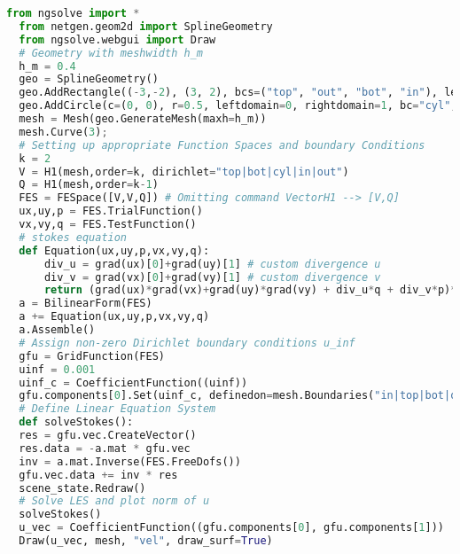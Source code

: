 \begin{appendix}
\begin{lstlisting}[language=Python, title=Basic Stokes PDE's with Python3 and NGSolve, label=basic_stokes]
  from ngsolve import *
  from netgen.geom2d import SplineGeometry
  from ngsolve.webgui import Draw
  # Geometry with meshwidth h_m
  h_m = 0.4
  geo = SplineGeometry()
  geo.AddRectangle((-3,-2), (3, 2), bcs=("top", "out", "bot", "in"), leftdomain=1, rightdomain=0)
  geo.AddCircle(c=(0, 0), r=0.5, leftdomain=0, rightdomain=1, bc="cyl", maxh=h_m) 
  mesh = Mesh(geo.GenerateMesh(maxh=h_m))
  mesh.Curve(3);
  # Setting up appropriate Function Spaces and boundary Conditions
  k = 2
  V = H1(mesh,order=k, dirichlet="top|bot|cyl|in|out")
  Q = H1(mesh,order=k-1)
  FES = FESpace([V,V,Q]) # Omitting command VectorH1 --> [V,Q] 
  ux,uy,p = FES.TrialFunction()
  vx,vy,q = FES.TestFunction()
  # stokes equation
  def Equation(ux,uy,p,vx,vy,q):
      div_u = grad(ux)[0]+grad(uy)[1] # custom divergence u
      div_v = grad(vx)[0]+grad(vy)[1] # custom divergence v
      return (grad(ux)*grad(vx)+grad(uy)*grad(vy) + div_u*q + div_v*p)* dx
  a = BilinearForm(FES)
  a += Equation(ux,uy,p,vx,vy,q)
  a.Assemble()
  # Assign non-zero Dirichlet boundary conditions u_inf
  gfu = GridFunction(FES)
  uinf = 0.001
  uinf_c = CoefficientFunction((uinf))
  gfu.components[0].Set(uinf_c, definedon=mesh.Boundaries("in|top|bot|out"))
  # Define Linear Equation System
  def solveStokes():
  res = gfu.vec.CreateVector()
  res.data = -a.mat * gfu.vec
  inv = a.mat.Inverse(FES.FreeDofs())
  gfu.vec.data += inv * res
  scene_state.Redraw()
  # Solve LES and plot norm of u
  solveStokes()
  u_vec = CoefficientFunction((gfu.components[0], gfu.components[1])) 
  Draw(u_vec, mesh, "vel", draw_surf=True)

\end{lstlisting}

\vfill

\end{appendix}
